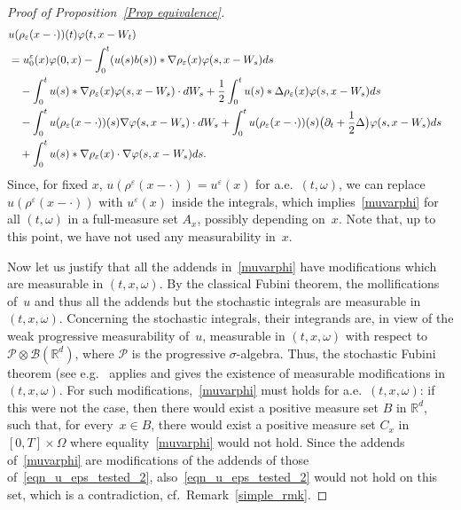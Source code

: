 \documentclass[a4paper,10pt]{article}
\newcommand\1{\mathbbm{1}}
\newcommand{\mc}{\mathcal}
\newcommand{\eps}{\varepsilon}
\numberwithin{equation}{section}
\begin{document}
\begin{proof}[Proof of Proposition~\ref{Prop equivalence}]
\begin{align}
\lefteqn{u(\rho_\eps(x-\cdot))(t)\varphi(t,x-W_t)} \\
 & = u_0^\eps(x)\varphi(0,x) -\int^t_0(u(s) b(s))*\nabla\rho_\eps(x)\varphi(s,x-W_s) d s \nonumber \\
 & \quad -\int^t_0 u(s)*\nabla\rho_\eps(x)\varphi(s,x-W_s)\cdot d W_s +\frac12 \int^t_0 u(s)*\Delta\rho_\eps(x)\varphi(s,x-W_s) ds \nonumber \\
 & \quad - \int^t_0 u(\rho_\eps(x-\cdot))(s)\nabla\varphi(s,x-W_s)\cdot d W_s 
 + \int^t_0 u(\rho_\eps(x-\cdot))(s) \big(\partial_t+\frac12\Delta\big)\varphi(s,x-W_s) d s \nonumber \\
 & \quad +\int^t_0 u(s)*\nabla\rho_\eps(x)\cdot\nabla\varphi(s,x-W_s) ds. \nonumber
\end{align}
Since, for fixed $x$, $u(\rho^\eps(x-\cdot))=u^\eps(x)$ for a.e.~$(t,\omega)$, we can replace $u(\rho^\eps(x-\cdot))$ with $u^\eps(x)$ inside the integrals, which implies~\eqref{muvarphi} for all $(t,\omega)$ in a full-measure set $A_x$, possibly depending on~$x$. Note that, up to this point, we have not used any measurability in~$x$.

Now let us justify that all the addends in~\eqref{muvarphi} have modifications which are measurable in $(t,x,\omega)$. By the classical Fubini theorem, the mollifications of~$u$ and thus all the addends but the stochastic integrals are measurable in $(t,x,\omega)$. Concerning the stochastic integrals, their integrands are, in view of the weak progressive measurability of~$u$, measurable in $(t,x,\omega)$ with respect to $\mc{P}\otimes\mc{B}(\mathbb{R}^d)$, where $\mc{P}$ is the progressive $\sigma$-algebra. Thus, the stochastic Fubini theorem (see e.g.~\cite[Theorem~2.2]{VERAAR12} applies and gives the existence of measurable modifications in $(t,x,\omega)$. For such modifications,~\eqref{muvarphi} must holds for a.e.~$(t,x,\omega)$: if this were not the case, then there would exist a positive measure set $B$ in $\mathbb{R}^d$, such that, for every~$x \in B$, there would exist a positive measure set $C_x$ in $[0,T]\times\Omega$ where equality~\eqref{muvarphi} would not hold. Since the addends of~\eqref{muvarphi} are modifications of the addends of those of~\eqref{eqn_u_eps_tested_2}, also~\eqref{eqn_u_eps_tested_2} would not hold on this set, which is a contradiction, cf.~Remark~\ref{simple_rmk}.


\end{proof}
\end{document}
